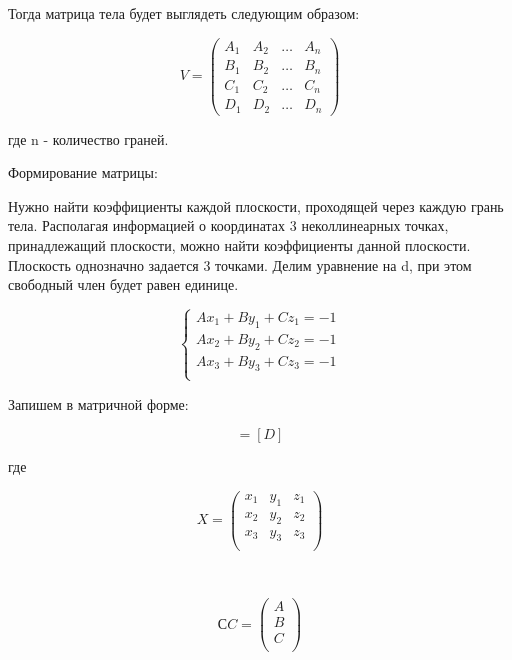 Тогда матрица тела будет выглядеть следующим образом:

\begin{equation}
	V = \left(
	\begin{array}{cccc}
			A_{1} & A_{2} & \ldots & A_{n} \\
			B_{1} & B_{2} & \ldots & B_{n} \\
			C_{1} & C_{2} & \ldots & C_{n} \\
			D_{1} & D_{2} & \ldots & D_{n}
		\end{array}
	\right)
\end{equation}

где n - количество граней.

Формирование матрицы:

Нужно найти коэффициенты каждой плоскости, проходящей через каждую грань тела. Располагая информацией о координатах 3 неколлинеарных точках, принадлежащий плоскости, можно найти коэффициенты данной плоскости. Плоскость однозначно задается 3 точками. Делим уравнение на d, при этом свободный член будет равен единице.

\begin{equation}
	{\begin{cases} 
			Ax_1 + By_1 + Cz_1 = -1 \\
			Ax_2 + By_2 + Cz_2 = -1 \\
			Ax_3 + By_3 + Cz_3 = -1 \\
		\end{cases}}
\end{equation}

Запишем в матричной форме:

\begin{equation}
	[X][C] = [D]
	\label{eq:ref1}
\end{equation}

где

\begin{equation}
	X = \left(
	\begin{array}{cccc}
			x_{1} & y_{1} & z_{1} \\
			x_{2} & y_{2} & z_{2} \\
			x_{3} & y_{3} & z_{3} \\
		\end{array}
	\right)
\end{equation}

~

\begin{equation}
	СC = \left(
	\begin{array}{c}
			A \\
			B \\
			C \\
		\end{array}
	\right)
\end{equation}

